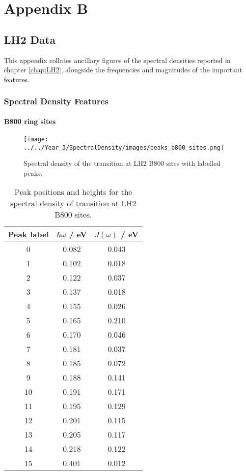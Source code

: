 %
%

\chapter{Appendix B}
\label{app:app02}
\section{LH2 Data}
\label{sec:lh2_data}

This appendix collates ancillary figures of the spectral densities reported in chapter
\ref{chap:LH2}, alongside the frequencies and magnitudes of the important features.

\subsection{Spectral Density Features}
\label{subsec:specdens_features}

\subsubsection{B800 ring sites}
\label{subsubsec:specdens_b800}

\begin{figure}
    \centering
    \texttt{[image: ../../Year\_3/SpectralDensity/images/peaks\_b800\_sites.png]}
    \caption{Spectral density of the \Qy transition at LH2 B800 sites with labelled
    peaks.}
    \label{fig:b800_lablled_peaks}
\end{figure}

\begin{table}
    \centering
    \begin{tabular}{||c c c||}
    \hline
    Peak label & $\hbar \omega$ / eV & $J\left(\omega\right)$ / eV \\
    \hline\hline
    
     0 & 0.082 & 0.043 \\
     1 & 0.102 & 0.018 \\
     2 & 0.122 & 0.037 \\
     3 & 0.137 & 0.018 \\
     4 & 0.155 & 0.026 \\
     5 & 0.165 & 0.210 \\
     6 & 0.170 & 0.046 \\
     7 & 0.181 & 0.037 \\
     8 & 0.185 & 0.072 \\
     9 & 0.188 & 0.141 \\
     10 & 0.191 & 0.171 \\
     11 & 0.195 & 0.129 \\
     12 & 0.201 & 0.115 \\
     13 & 0.205 & 0.117 \\
     14 & 0.218 & 0.122 \\
     15 & 0.401 & 0.012 \\
    \hline 
    \end{tabular}
    \caption{Peak positions and heights for the spectral density of \Qy transition 
    at LH2 B800 sites.}
    \label{tab:b800_lablled_peaks}
\end{table}

